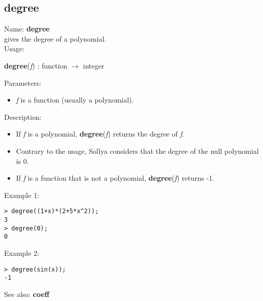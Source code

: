 \subsection{ degree }
\noindent Name: \textbf{degree}\\
gives the degree of a polynomial.\\

\noindent Usage: 
\begin{center}
\textbf{degree}(\emph{f}) : \textsf{function} $\rightarrow$ \textsf{integer}\\
\end{center}
Parameters: 
\begin{itemize}
\item \emph{f} is a function (usually a polynomial).
\end{itemize}
\noindent Description: \begin{itemize}

\item If \emph{f} is a polynomial, \textbf{degree}(\emph{f}) returns the degree of \emph{f}.

\item Contrary to the usage, Sollya considers that the degree of the null polynomial
   is 0.

\item If \emph{f} is a function that is not a polynomial, \textbf{degree}(\emph{f}) returns -1.
\end{itemize}
\noindent Example 1: 
\begin{center}\begin{minipage}{15cm}\begin{Verbatim}[frame=single]
> degree((1+x)*(2+5*x^2));
3
> degree(0);
0
\end{Verbatim}
\end{minipage}\end{center}
\noindent Example 2: 
\begin{center}\begin{minipage}{15cm}\begin{Verbatim}[frame=single]
> degree(sin(x));
-1
\end{Verbatim}
\end{minipage}\end{center}
See also: \textbf{coeff}
